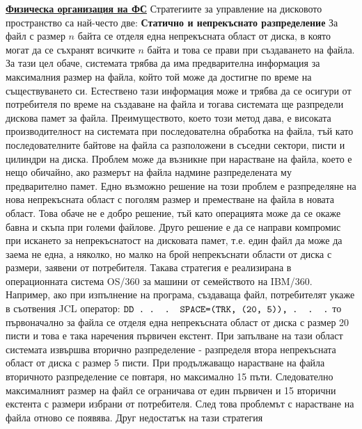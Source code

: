 \documentclass{article}
\newcommand{\cplain}[1]{\textcolor{black}{\texttt{#1}}}
\begin{document}
\textbf{\underline{Физическа организация на ФС}} \newline\newline
Стратегиите за управление на дисковото пространство са най-често две: \newline\newline
\textbf{Статично и непрекъснато разпределение} \newline\newline
За файл с размер $n$ байта се отделя една непрекъсната област от диска, в която могат да се съхранят всичките $n$ байта и това се
прави при създаването на файла. За тази цел обаче, системата трябва да има предварителна информация за максималния размер на файла, който
той може да достигне по време на съществуването си. Естествено тази информация може и трябва да се осигури от потребителя по време на
създаване на файла и тогава системата ще разпредели дискова памет за файла. Преимуществото, което този метод дава, е високата производителност
на системата при последователна обработка на файла, тъй като последователните байтове на файла са разположени в съседни сектори, писти и цилиндри на диска.
Проблем може да възникне при нарастване на файла, което е нещо обичайно, ако размерът на файла надмине разпределената му предварително памет.
Едно възможно решение на този проблем е разпределяне на нова непрекъсната област с поголям размер и преместване на файла в новата област.
Това обаче не е добро решение, тъй като операцията може да се окаже бавна и скъпа при големи файлове. Друго решение е да се направи компромис
при искането за непрекъснатост на дисковата памет, т.е. един файл да може да заема не една, а няколко, но малко на брой непрекъснати области
от диска с размери, заявени от потребителя. Такава стратегия е реализирана в операционната система OS/360 за машини от семейството на IBM/360.
Например, ако при изпълнение на програма, създаваща файл, потребителят укаже в съотвения JCL оператор: \newline
$\cplain{DD . . . SPACE=(TRK, (20, 5)), . . .}$ \newline
то първоначално за файла се отделя една непрекъсната област от диска с размер 20 писти и това е така наречения първичен екстент. При запълване на
тази област системата извършва вторично разпределение - разпределя втора непрекъсната област от диска с размер 5 писти. При продължаващо нарастване
на файла вторичното разпределение се повтаря, но максимално 15 пъти. Следователно максималният размер на файл се ограничава от един първичен и 15
вторични екстента с размери избрани от потребителя. След това проблемът с нарастване на файла отново се появява. Друг недостатък на тази стратегия
\end{document}
